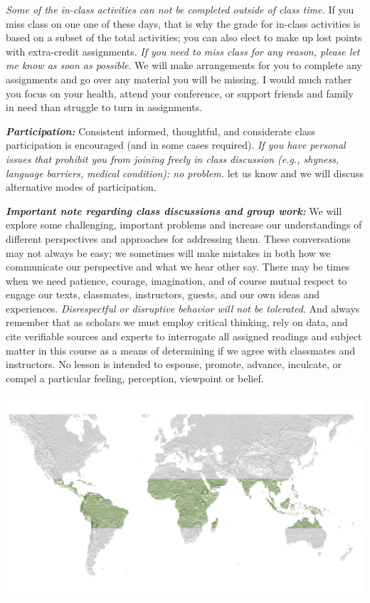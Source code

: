 \documentclass[
  12pt,
]{article}
\begin{document}
\emph{Some of the in-class activities can not be completed outside of
class time.} If you miss class on one one of these days, that is why the
grade for in-class activities is based on a subset of the total
activities; you can also elect to make up lost points with extra-credit
assignments. \emph{If you need to miss class for any reason, please let
me know as soon as possible}. We will make arrangements for you to
complete any assignments and go over any material you will be missing. I
would much rather you focus on your health, attend your conference, or
support friends and family in need than struggle to turn in assignments.

\textbf{\emph{Participation:}} Consistent informed, thoughtful, and
considerate class participation is encouraged (and in some cases
required). \emph{If you have personal issues that prohibit you from
joining freely in class discussion (e.g., shyness, language barriers,
medical condition): no problem.} let us know and we will discuss
alternative modes of participation.

\textbf{\emph{Important note regarding class discussions and group
work:}} We will explore some challenging, important problems and
increase our understandings of different perspectives and approaches for
addressing them. These conversations may not always be easy; we
sometimes will make mistakes in both how we communicate our perspective
and what we hear other say. There may be times when we need patience,
courage, imagination, and of course mutual respect to engage our texts,
classmates, instructors, guests, and our own ideas and experiences.
\emph{Disrespectful or disruptive behavior will not be tolerated}. And
always remember that as scholars we must employ critical thinking, rely
on data, and cite verifiable sources and experts to interrogate all
assigned readings and subject matter in this course as a means of
determining if we agree with classmates and instructors. No lesson is
intended to espouse, promote, advance, inculcate, or compel a particular
feeling, perception, viewpoint or belief.

\begin{center}\includegraphics[width=0.9\linewidth]{./icons/ridges} \end{center}
\end{document}
